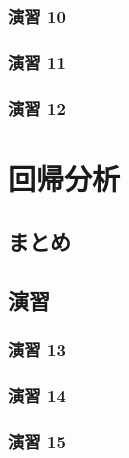 \documentclass[
  12pt,
]{book}
\begin{document}
\hypertarget{ux6f14ux7fd2-10-1}{%
\subsubsection*{演習 10}\label{ux6f14ux7fd2-10-1}}

\hypertarget{ux6f14ux7fd2-11}{%
\subsubsection*{演習 11}\label{ux6f14ux7fd2-11}}

\hypertarget{ux6f14ux7fd2-12}{%
\subsubsection*{演習 12}\label{ux6f14ux7fd2-12}}

\hypertarget{ux56deux5e30ux5206ux6790}{%
\section{回帰分析}\label{ux56deux5e30ux5206ux6790}}

\hypertarget{ux307eux3068ux3081-5}{%
\subsection{まとめ}\label{ux307eux3068ux3081-5}}

\hypertarget{ux6f14ux7fd2-13}{%
\subsection{演習}\label{ux6f14ux7fd2-13}}

\hypertarget{ux6f14ux7fd2-13-1}{%
\subsubsection*{演習 13}\label{ux6f14ux7fd2-13-1}}

\hypertarget{ux6f14ux7fd2-14}{%
\subsubsection*{演習 14}\label{ux6f14ux7fd2-14}}

\hypertarget{ux6f14ux7fd2-15}{%
\subsubsection*{演習 15}\label{ux6f14ux7fd2-15}}
\end{document}
